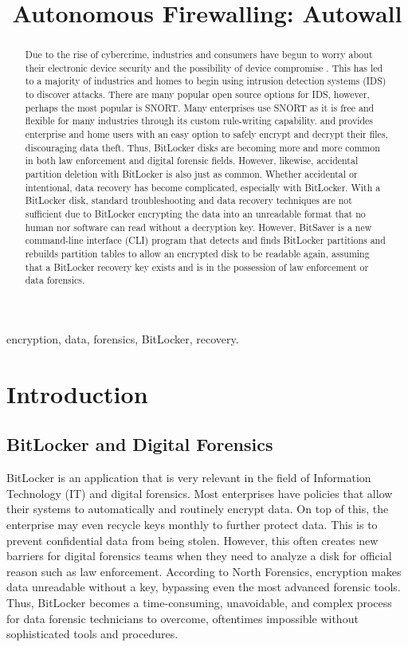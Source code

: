 \documentclass[conference]{IEEEtran} \IEEEoverridecommandlockouts
\title{Autonomous Firewalling: Autowall\\}
\author{\IEEEauthorblockN{Alvin Leung} \IEEEauthorblockA{\textit{Computer
Science and Engineering} \\ \textit{Univerisity of Nevada, Reno}\\ Reno, United
States of America \\ aleung@unr.edu} }
\begin{document}
\maketitle

\begin{abstract} Due to the rise of cybercrime, industries
	and consumers have begun to worry about their electronic device security and the possibility of device compromise
	. This has led to
	a majority of industries and homes to begin using
	intrusion detection systems (IDS) to discover attacks. There are many popular open source options for IDS, however,  
	perhaps the most popular is SNORT. Many enterprises use SNORT as it is free and flexible for many industries
	through its custom rule-writing capability.
	and provides enterprise and
	home users with an easy option to safely encrypt and decrypt their files, discouraging
	data theft. Thus, BitLocker disks are becoming more and more common in
	both law enforcement and digital forensic fields. However, likewise, accidental partition deletion with
	BitLocker is also just as common. Whether accidental or intentional, 
	data recovery has become complicated, especially with BitLocker. 
	With a BitLocker disk, standard troubleshooting and data recovery techniques are not 
	sufficient due to BitLocker encrypting the data into an unreadable format
	that no human nor software can read without a decryption key. However, BitSaver is a new command-line interface (CLI) program that
	detects and finds BitLocker partitions and rebuilds partition tables to
allow an encrypted disk to be readable again, assuming that a BitLocker
recovery key exists and is in the possession of law enforcement or data
forensics. \end{abstract}

\begin{IEEEkeywords} encryption, data, forensics, BitLocker, recovery.
\end{IEEEkeywords}

\section{Introduction}

\subsection{BitLocker and Digital Forensics} BitLocker is an application that
is very relevant in the field of Information Technology (IT) and digital
forensics. Most enterprises have policies that allow their systems to
automatically and routinely encrypt data. On top of this, the enterprise may even
recycle keys monthly to further protect data. This is to prevent confidential
data from being stolen. However, this often creates new barriers for digital
forensics teams when they need to analyze a disk for official reason such as
law enforcement. According to North Forensics, encryption makes data unreadable
without a key, bypassing even the most advanced forensic tools. Thus, BitLocker becomes a
time-consuming, unavoidable, and complex process for data forensic technicians to overcome, oftentimes
impossible without sophisticated tools and procedures.
\end{document}
